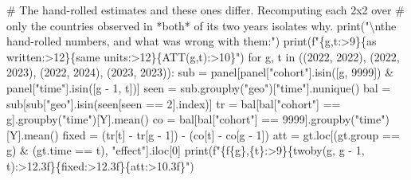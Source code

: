\documentclass[
  letterpaper,
  10pt,
  twoside,
  openright,
  numbers=noenddot,
  chapterprefix=true]{scrbook}
\newenvironment{Shaded}{}{}
\newcommand{\BuiltInTok}[1]{\textcolor[rgb]{0.84,0.23,0.29}{#1}}
\newcommand{\CharTok}[1]{\textcolor[rgb]{0.01,0.18,0.38}{#1}}
\newcommand{\CommentTok}[1]{\textcolor[rgb]{0.42,0.45,0.49}{#1}}
\newcommand{\ControlFlowTok}[1]{\textcolor[rgb]{0.84,0.23,0.29}{#1}}
\newcommand{\DecValTok}[1]{\textcolor[rgb]{0.00,0.36,0.77}{#1}}
\newcommand{\KeywordTok}[1]{\textcolor[rgb]{0.84,0.23,0.29}{#1}}
\newcommand{\NormalTok}[1]{\textcolor[rgb]{0.14,0.16,0.18}{#1}}
\newcommand{\OperatorTok}[1]{\textcolor[rgb]{0.14,0.16,0.18}{#1}}
\newcommand{\SpecialCharTok}[1]{\textcolor[rgb]{0.00,0.36,0.77}{#1}}
\newcommand{\SpecialStringTok}[1]{\textcolor[rgb]{0.01,0.18,0.38}{#1}}
\newcommand{\StringTok}[1]{\textcolor[rgb]{0.01,0.18,0.38}{#1}}
\begin{document}
\begin{Shaded}
\begin{Highlighting}[]
\CommentTok{\# The hand{-}rolled estimates and these ones differ. Recomputing each 2x2 over}
\CommentTok{\# only the countries observed in *both* of its two years isolates why.}
\BuiltInTok{print}\NormalTok{(}\StringTok{"}\CharTok{\textbackslash{}n}\StringTok{the hand{-}rolled numbers, and what was wrong with them:"}\NormalTok{)}
\BuiltInTok{print}\NormalTok{(}\SpecialStringTok{f"}\SpecialCharTok{\{}\StringTok{\textquotesingle{}g,t\textquotesingle{}}\SpecialCharTok{:\textgreater{}9\}\{}\StringTok{\textquotesingle{}as written\textquotesingle{}}\SpecialCharTok{:\textgreater{}12\}\{}\StringTok{\textquotesingle{}same units\textquotesingle{}}\SpecialCharTok{:\textgreater{}12\}\{}\StringTok{\textquotesingle{}ATT(g,t)\textquotesingle{}}\SpecialCharTok{:\textgreater{}10\}}\SpecialStringTok{"}\NormalTok{)}
\ControlFlowTok{for}\NormalTok{ g, t }\KeywordTok{in}\NormalTok{ ((}\DecValTok{2022}\NormalTok{, }\DecValTok{2022}\NormalTok{), (}\DecValTok{2022}\NormalTok{, }\DecValTok{2023}\NormalTok{), (}\DecValTok{2022}\NormalTok{, }\DecValTok{2024}\NormalTok{), (}\DecValTok{2023}\NormalTok{, }\DecValTok{2023}\NormalTok{)):}
\NormalTok{    sub }\OperatorTok{=}\NormalTok{ panel[panel[}\StringTok{"cohort"}\NormalTok{].isin([g, }\DecValTok{9999}\NormalTok{]) }\OperatorTok{\&}\NormalTok{ panel[}\StringTok{"time"}\NormalTok{].isin([g }\OperatorTok{{-}} \DecValTok{1}\NormalTok{, t])]}
\NormalTok{    seen }\OperatorTok{=}\NormalTok{ sub.groupby(}\StringTok{"geo"}\NormalTok{)[}\StringTok{"time"}\NormalTok{].nunique()}
\NormalTok{    bal }\OperatorTok{=}\NormalTok{ sub[sub[}\StringTok{"geo"}\NormalTok{].isin(seen[seen }\OperatorTok{==} \DecValTok{2}\NormalTok{].index)]}
\NormalTok{    tr }\OperatorTok{=}\NormalTok{ bal[bal[}\StringTok{"cohort"}\NormalTok{] }\OperatorTok{==}\NormalTok{ g].groupby(}\StringTok{"time"}\NormalTok{)[Y].mean()}
\NormalTok{    co }\OperatorTok{=}\NormalTok{ bal[bal[}\StringTok{"cohort"}\NormalTok{] }\OperatorTok{==} \DecValTok{9999}\NormalTok{].groupby(}\StringTok{"time"}\NormalTok{)[Y].mean()}
\NormalTok{    fixed }\OperatorTok{=}\NormalTok{ (tr[t] }\OperatorTok{{-}}\NormalTok{ tr[g }\OperatorTok{{-}} \DecValTok{1}\NormalTok{]) }\OperatorTok{{-}}\NormalTok{ (co[t] }\OperatorTok{{-}}\NormalTok{ co[g }\OperatorTok{{-}} \DecValTok{1}\NormalTok{])}
\NormalTok{    att }\OperatorTok{=}\NormalTok{ gt.loc[(gt.group }\OperatorTok{==}\NormalTok{ g) }\OperatorTok{\&}\NormalTok{ (gt.time }\OperatorTok{==}\NormalTok{ t), }\StringTok{"effect"}\NormalTok{].iloc[}\DecValTok{0}\NormalTok{]}
    \BuiltInTok{print}\NormalTok{(}\SpecialStringTok{f"}\SpecialCharTok{\{}\SpecialStringTok{f\textquotesingle{}}\SpecialCharTok{\{}\NormalTok{g}\SpecialCharTok{\}}\SpecialStringTok{,}\SpecialCharTok{\{}\NormalTok{t}\SpecialCharTok{\}}\SpecialStringTok{\textquotesingle{}}\SpecialCharTok{:\textgreater{}9\}\{}\NormalTok{twoby(g, g }\OperatorTok{{-}} \DecValTok{1}\NormalTok{, t)}\SpecialCharTok{:\textgreater{}12.3f\}\{}\NormalTok{fixed}\SpecialCharTok{:\textgreater{}12.3f\}\{}\NormalTok{att}\SpecialCharTok{:\textgreater{}10.3f\}}\SpecialStringTok{"}\NormalTok{)}
\end{Highlighting}
\end{Shaded}
\end{document}
